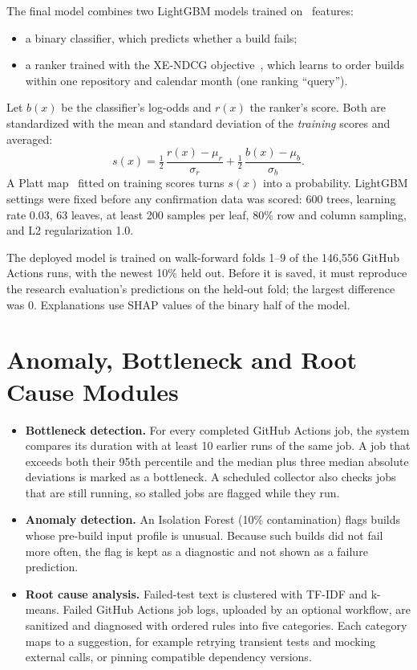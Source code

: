 The final model combines two LightGBM models trained on \tierE\ features:
\begin{itemize}
\item a binary classifier, which predicts whether a build fails;
\item a ranker trained with the XE-NDCG objective~\cite{bruch2021alternative}, which learns to order builds within one repository and calendar month (one ranking ``query'').
\end{itemize}
Let $b(x)$ be the classifier's log-odds and $r(x)$ the ranker's score. Both are standardized with the mean and standard deviation of the \emph{training} scores and averaged:
\begin{equation}
s(x) = \tfrac{1}{2}\,\frac{r(x)-\mu_r}{\sigma_r} + \tfrac{1}{2}\,\frac{b(x)-\mu_b}{\sigma_b}.
\end{equation}
A Platt map~\cite{platt1999probabilistic} fitted on training scores turns $s(x)$ into a probability. LightGBM settings were fixed before any confirmation data was scored: 600 trees, learning rate 0.03, 63 leaves, at least 200 samples per leaf, 80\% row and column sampling, and L2 regularization 1.0.

The deployed model is trained on walk-forward folds 1--9 of the 146,556 GitHub Actions runs, with the newest 10\% held out. Before it is saved, it must reproduce the research evaluation's predictions on the held-out fold; the largest difference was 0. Explanations use SHAP values of the binary half of the model.

\section{Anomaly, Bottleneck and Root Cause Modules}
\label{sec:aux}
\begin{itemize}
\item \textbf{Bottleneck detection.} For every completed GitHub Actions job, the system compares its duration with at least 10 earlier runs of the same job. A job that exceeds both their 95th percentile and the median plus three median absolute deviations is marked as a bottleneck. A scheduled collector also checks jobs that are still running, so stalled jobs are flagged while they run.
\item \textbf{Anomaly detection.} An Isolation Forest (10\% contamination) flags builds whose pre-build input profile is unusual. Because such builds did not fail more often, the flag is kept as a diagnostic and not shown as a failure prediction.
\item \textbf{Root cause analysis.} Failed-test text is clustered with TF-IDF and k-means. Failed GitHub Actions job logs, uploaded by an optional workflow, are sanitized and diagnosed with ordered rules into five categories. Each category maps to a suggestion, for example retrying transient tests and mocking external calls, or pinning compatible dependency versions.
\end{itemize}

